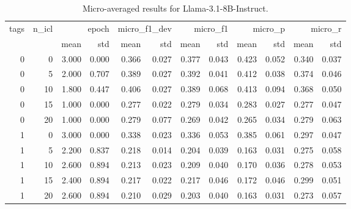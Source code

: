 \begin{table}
\caption{Micro-averaged results for Llama-3.1-8B-Instruct.}
\label{results_micro}
\begin{tabular}{rrrrrrrrrrrr}
\toprule
tags & n\_icl & \multicolumn{2}{r}{epoch} & \multicolumn{2}{r}{micro\_f1\_dev} & \multicolumn{2}{r}{micro\_f1} & \multicolumn{2}{r}{micro\_p} & \multicolumn{2}{r}{micro\_r} \\
 &  & mean & std & mean & std & mean & std & mean & std & mean & std \\
\midrule
0 & 0 & 3.000 & 0.000 & 0.366 & 0.027 & 0.377 & 0.043 & 0.423 & 0.052 & 0.340 & 0.037 \\
0 & 5 & 2.000 & 0.707 & 0.389 & 0.027 & 0.392 & 0.041 & 0.412 & 0.038 & 0.374 & 0.046 \\
0 & 10 & 1.800 & 0.447 & 0.406 & 0.027 & 0.389 & 0.068 & 0.413 & 0.094 & 0.368 & 0.050 \\
0 & 15 & 1.000 & 0.000 & 0.277 & 0.022 & 0.279 & 0.034 & 0.283 & 0.027 & 0.277 & 0.047 \\
0 & 20 & 1.000 & 0.000 & 0.279 & 0.077 & 0.269 & 0.042 & 0.265 & 0.034 & 0.279 & 0.063 \\
1 & 0 & 3.000 & 0.000 & 0.338 & 0.023 & 0.336 & 0.053 & 0.385 & 0.061 & 0.297 & 0.047 \\
1 & 5 & 2.200 & 0.837 & 0.218 & 0.014 & 0.204 & 0.039 & 0.163 & 0.031 & 0.275 & 0.058 \\
1 & 10 & 2.600 & 0.894 & 0.213 & 0.023 & 0.209 & 0.040 & 0.170 & 0.036 & 0.278 & 0.053 \\
1 & 15 & 2.400 & 0.894 & 0.217 & 0.022 & 0.217 & 0.046 & 0.172 & 0.046 & 0.299 & 0.051 \\
1 & 20 & 2.600 & 0.894 & 0.210 & 0.029 & 0.203 & 0.040 & 0.163 & 0.031 & 0.273 & 0.057 \\
\bottomrule
\end{tabular}
\end{table}
